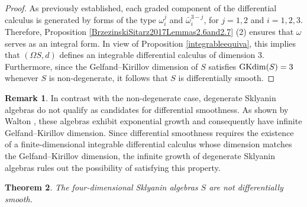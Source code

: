 \documentclass{amsart}
\newtheorem{theorem}{Theorem}[section]
\theoremstyle{definition}
\newtheorem{remark}[theorem]{Remark}
\theoremstyle{remark}
\numberwithin{equation}{section}
\begin{document}
\begin{proof}
As previously established, each graded component of the differential calculus is generated by forms of the type $\omega_i^j$ and $\bar{\omega}_i^{3-j}$, for $j = 1, 2$ and $i = 1, 2, 3$. Therefore, Proposition \ref{BrzezinskiSitarz2017Lemmas2.6and2.7} (2) ensures that $\omega$ serves as an integral form. In view of Proposition \ref{integrableequiva}, this implies that $(\Omega S, d)$ defines an integrable differential calculus of dimension $3$. Furthermore, since the Gelfand–Kirillov dimension of $S$ satisfies ${\rm GKdim}(S) = 3$ whenever $S$ is non-degenerate, it follows that $S$ is differentially smooth.
\end{proof}

\begin{remark}
In contrast with the non-degenerate case, degenerate Sklyanin algebras do not qualify as candidates for differential smoothness. As shown by Walton \cite[Theorem I.6 and Corollary III.9]{WaltonThesis2011}, these algebras exhibit exponential growth and consequently have infinite Gelfand–Kirillov dimension. Since differential smoothness requires the existence of a finite-dimensional integrable differential calculus whose dimension matches the Gelfand–Kirillov dimension, the infinite growth of degenerate Sklyanin algebras rules out the possibility of satisfying this property.
\end{remark}

\begin{theorem}\label{NODS4Skly} 
The four-dimensional Sklyanin algebras $S$ are not differentially smooth.
\end{theorem}
\end{document}

